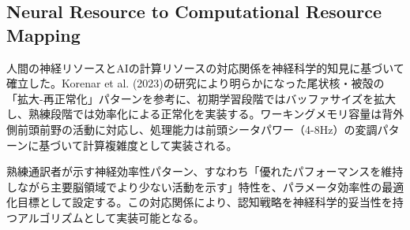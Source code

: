 \subsection{Neural Resource to Computational Resource Mapping}

人間の神経リソースとAIの計算リソースの対応関係を神経科学的知見に基づいて確立した。Korenar et al. (2023)の研究により明らかになった尾状核・被殻の「拡大-再正常化」パターンを参考に、初期学習段階ではバッファサイズを拡大し、熟練段階では効率化による正常化を実装する。ワーキングメモリ容量は背外側前頭前野の活動に対応し、処理能力は前頭シータパワー（4-8Hz）の変調パターンに基づいて計算複雑度として実装される。

熟練通訳者が示す神経効率性パターン、すなわち「優れたパフォーマンスを維持しながら主要脳領域でより少ない活動を示す」特性を、パラメータ効率性の最適化目標として設定する。この対応関係により、認知戦略を神経科学的妥当性を持つアルゴリズムとして実装可能となる。 